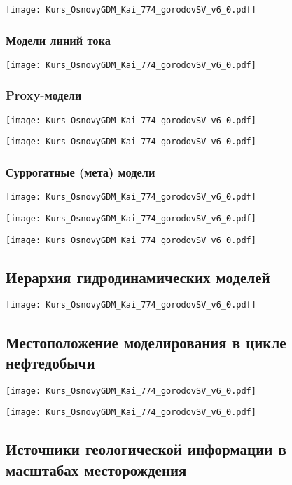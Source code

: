 \documentclass[main.tex]{subfiles}
\begin{document}
\texttt{[image: Kurs\_OsnovyGDM\_Kai\_774\_gorodovSV\_v6\_0.pdf]}

\subsubsection{Модели линий тока}

\texttt{[image: Kurs\_OsnovyGDM\_Kai\_774\_gorodovSV\_v6\_0.pdf]}

\subsubsection{Proxy-модели}

\texttt{[image: Kurs\_OsnovyGDM\_Kai\_774\_gorodovSV\_v6\_0.pdf]}

\texttt{[image: Kurs\_OsnovyGDM\_Kai\_774\_gorodovSV\_v6\_0.pdf]}

\subsubsection{Суррогатные (мета) модели}

\texttt{[image: Kurs\_OsnovyGDM\_Kai\_774\_gorodovSV\_v6\_0.pdf]}

\texttt{[image: Kurs\_OsnovyGDM\_Kai\_774\_gorodovSV\_v6\_0.pdf]}

\texttt{[image: Kurs\_OsnovyGDM\_Kai\_774\_gorodovSV\_v6\_0.pdf]}

\subsection{Иерархия гидродинамических моделей}

\texttt{[image: Kurs\_OsnovyGDM\_Kai\_774\_gorodovSV\_v6\_0.pdf]}

\subsection{Местоположение моделирования в цикле нефтедобычи}

\texttt{[image: Kurs\_OsnovyGDM\_Kai\_774\_gorodovSV\_v6\_0.pdf]}

\texttt{[image: Kurs\_OsnovyGDM\_Kai\_774\_gorodovSV\_v6\_0.pdf]}

\subsection{Источники геологической информации в масштабах месторождения}
\end{document}
